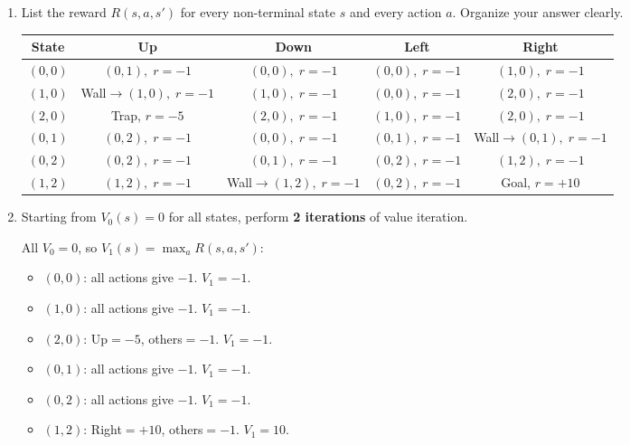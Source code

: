 \documentclass[12pt]{article}
\begin{document}
\begin{enumerate}[label=(\alph*)]
\item List the reward $R(s, a, s')$ for every non-terminal state $s$ and every action $a$. Organize your answer clearly.

\begin{stepbox}[Solution 4(a)]
\begin{center}
\begin{tabular}{ccccc}
\toprule
\textbf{State} & \textbf{Up} & \textbf{Down} & \textbf{Left} & \textbf{Right} \\
\midrule
$(0,0)$ & $(0,1),\; r{=}{-1}$ & $(0,0),\; r{=}{-1}$ & $(0,0),\; r{=}{-1}$ & $(1,0),\; r{=}{-1}$ \\
$(1,0)$ & Wall$\to(1,0),\; r{=}{-1}$ & $(1,0),\; r{=}{-1}$ & $(0,0),\; r{=}{-1}$ & $(2,0),\; r{=}{-1}$ \\
$(2,0)$ & Trap,\; $r{=}{-5}$ & $(2,0),\; r{=}{-1}$ & $(1,0),\; r{=}{-1}$ & $(2,0),\; r{=}{-1}$ \\
$(0,1)$ & $(0,2),\; r{=}{-1}$ & $(0,0),\; r{=}{-1}$ & $(0,1),\; r{=}{-1}$ & Wall$\to(0,1),\; r{=}{-1}$ \\
$(0,2)$ & $(0,2),\; r{=}{-1}$ & $(0,1),\; r{=}{-1}$ & $(0,2),\; r{=}{-1}$ & $(1,2),\; r{=}{-1}$ \\
$(1,2)$ & $(1,2),\; r{=}{-1}$ & Wall$\to(1,2),\; r{=}{-1}$ & $(0,2),\; r{=}{-1}$ & Goal,\; $r{=}{+10}$ \\
\bottomrule
\end{tabular}
\end{center}
\end{stepbox}

\item Starting from $V_0(s) = 0$ for all states, perform \textbf{2 iterations} of value iteration.

\begin{stepbox}
All $V_0 = 0$, so $V_1(s) = \max_a R(s,a,s')$:
\begin{itemize}[nosep]
\item $(0,0)$: all actions give $-1$. $V_1 = -1$.
\item $(1,0)$: all actions give $-1$. $V_1 = -1$.
\item $(2,0)$: Up$=-5$, others$=-1$. $V_1 = -1$.
\item $(0,1)$: all actions give $-1$. $V_1 = -1$.
\item $(0,2)$: all actions give $-1$. $V_1 = -1$.
\item $(1,2)$: Right$=+10$, others$=-1$. $V_1 = 10$.
\end{itemize}
\end{stepbox}


\end{enumerate}
\end{document}
